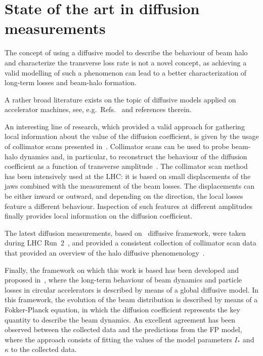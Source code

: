 \section{State of the art in diffusion measurements}

The concept of using a diffusive model to describe the behaviour of beam halo and characterize the transverse loss rate is not a novel concept, as achieving a valid modelling of such a phenomenon can lead to a better characterization of long-term losses and beam-halo formation.

A rather broad literature exists on the topic of diffusive models applied on accelerator machines, see, e.g.\ Refs.~\cite{Burnod:205343,Meddahi:223301,PhysRevLett.68.33,gerasimov1992applicability,zimmermann1994transverse,PhysRevLett.77.1051,PhysRevSTAB.5.074001,flilleriii:pac03-rpag004} and references therein. %

An interesting line of research, which provided a valid approach for gathering local information about the value of the diffusion coefficient, is given by the usage of collimator scans presented in~\cite{MESS1994279}. Collimator scans can be used to probe beam-halo dynamics and, in particular, to reconstruct the behaviour of the diffusion coefficient as a function of transverse amplitude~\cite{stancari2011diffusion,PhysRevSTAB.16.021003,PhysRevAccelBeams.23.044802}. The collimator scan method has been intensively used at the LHC: it is based on small displacements of the jaws combined with the measurement of the beam losses. The displacements can be either inward or outward, and depending on the direction, the local losses feature a different behaviour. Inspection of such features at different amplitudes finally provides local information on the diffusion coefficient.

The latest diffusion measurements, based on~\cite{stancari2011diffusion} diffusive framework, were taken during LHC Run~2~\cite{Valentino:2280928}, and provided a consistent collection of collimator scan data that provided an overview of the halo diffusive phenomenology~\cite{PhysRevAccelBeams.23.044802}.  

Finally, the framework on which this work is based has been developed and proposed in~\cite{Bazzani:2019lse,bazzani2020diffusion}, where the long-term behaviour of beam dynamics and particle losses in circular accelerators is described by means of a global diffusive model. In this framework, the evolution of the beam distribution is described by means of a Fokker-Planck equation, in which the diffusion coefficient represents the key quantity to describe the beam dynamics. An excellent agreement has been observed between the collected data and the predictions from the FP model, where the approach consists of fitting the values of the model parameters $I_\ast$ and $\kappa$ to the collected data.


